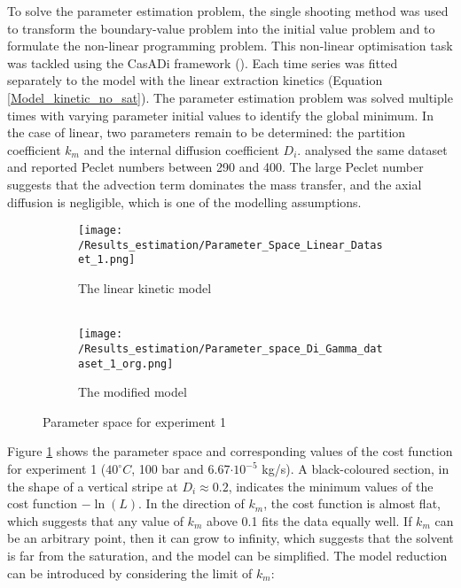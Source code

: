 \documentclass[../Supercritical_fluid_extraction_of_essential_oil_from_chamomile.tex]{subfiles}
\begin{document}
	
	\label{CH: Results}
		
	To solve the parameter estimation problem, the single shooting method was used to transform the boundary-value problem into the initial value problem and to formulate the non-linear programming problem. This non-linear optimisation task was tackled using the CasADi framework (\citet{Andersson2018}). Each time series was fitted separately to the model with the linear extraction kinetics (Equation \ref{Model_kinetic_no_sat}). The parameter estimation problem was solved multiple times with varying parameter initial values to identify the global minimum. In the case of linear, two parameters remain to be determined: the partition coefficient $k_m$ and the internal diffusion coefficient $D_i$. \citet{Rahimi2011} analysed the same dataset and reported Peclet numbers between 290 and 400. The large Peclet number suggests that the advection term dominates the mass transfer, and the axial diffusion is negligible, which is one of the modelling assumptions.
		
	\begin{figure}[!h]
		\centering
		\begin{subfigure}{0.9\columnwidth}
			\centering
			\texttt{[image: /Results\_estimation/Parameter\_Space\_Linear\_Dataset\_1.png]}
			\caption{The linear kinetic model \\ ~}
			\label{fig: Fit_1_linear}
		\end{subfigure}
		\hfill
		\begin{subfigure}{0.9\columnwidth}
			\centering
			\texttt{[image: /Results\_estimation/Parameter\_space\_Di\_Gamma\_dataset\_1\_org.png]}
			\caption{The modified model}
			\label{fig: Fit_1_Di_Gamma}
		\end{subfigure}
		\caption{Parameter space for experiment 1}
	\end{figure}
	
	Figure \ref{fig: Fit_1_linear} shows the parameter space and corresponding values of the cost function for experiment 1 ($40^\circ C$, 100 bar and 6.67$\cdot 10^{-5}$ kg/s). A black-coloured section, in the shape of a vertical stripe at $D_i \approx 0.2$, indicates the minimum values of the cost function $-\ln(L)$. In the direction of $k_m$, the cost function is almost flat, which suggests that any value of $k_m$ above 0.1 fits the data equally well. If $k_m$ can be an arbitrary point, then it can grow to infinity, which suggests that the solvent is far from the saturation, and the model can be simplified. The model reduction can be introduced by considering the limit of $k_m$:
		
\end{document}
